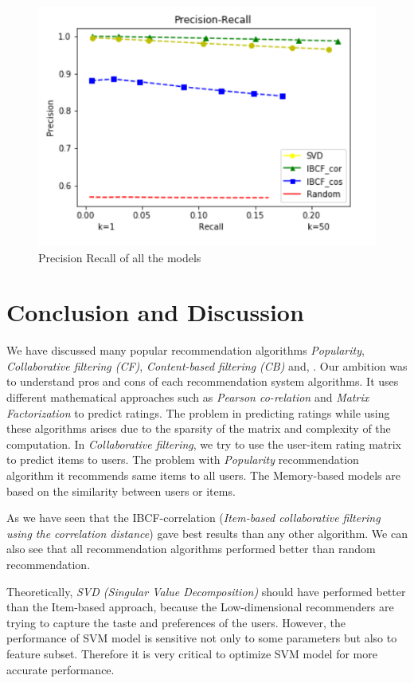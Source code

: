 \documentclass[conference]{IEEEtran}
\begin{document}
\begin{figure}[htbp]
\centerline{\includegraphics[scale=0.5]{precision_recall.png}}
\caption{Precision Recall of all the models}
\label{fig}
\end{figure}

\section{Conclusion and Discussion}
We have discussed many popular recommendation algorithms \textit{Popularity}, \textit{Collaborative filtering (CF)}, \textit{Content-based filtering (CB)} and, . Our ambition was to understand pros and cons of each recommendation system algorithms.
It uses different mathematical approaches such as \textit{Pearson co-relation} and \textit{Matrix Factorization} to predict ratings. The problem in predicting ratings while using these algorithms arises due to the sparsity of the matrix and complexity of the computation.
In \textit{Collaborative filtering}, we try to use the user-item rating matrix to predict items to users.  
The problem with \textit{Popularity} recommendation algorithm it recommends same items to all users. The Memory-based models are based on the similarity between users or items. 

As we have seen that the IBCF-correlation (\textit{Item-based collaborative filtering using the correlation distance}) gave best results than any other algorithm. We can also see that all recommendation algorithms performed better than random recommendation.

Theoretically, \textit{SVD (Singular Value Decomposition)} should have performed better than the Item-based approach, because the Low-dimensional recommenders are trying to capture the taste and preferences of the users. However, the performance of SVM model is sensitive not only to some parameters but also to feature subset. Therefore it is very critical to optimize SVM model for more accurate performance. 
\end{document}
